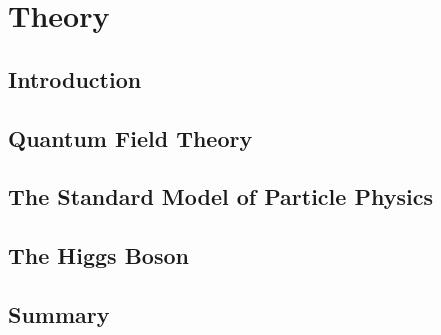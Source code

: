 \chapter{Theory}

\section{Introduction} \label{sec:theory_intro}

\section{Quantum Field Theory} \label{sec:theory_qft}

\section{The Standard Model of Particle Physics} \label{sec:theory_sm}

\section{The Higgs Boson} \label{sec:theory_higgs}

\section{Summary} \label{sec:theory_summary}
